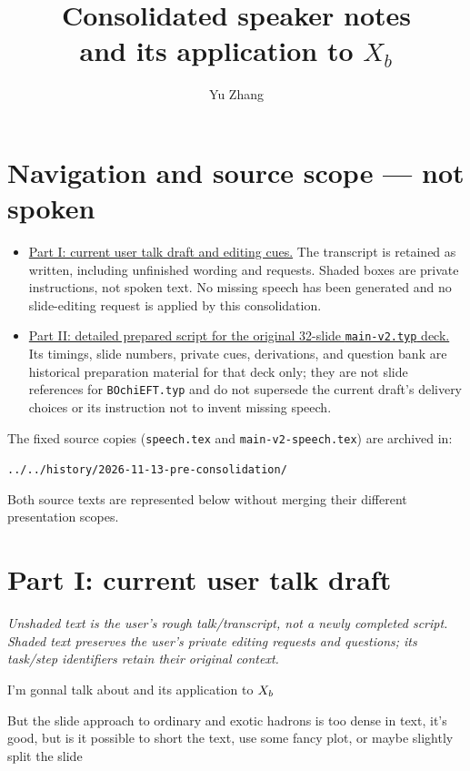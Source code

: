 \documentclass[11pt,a4paper]{article}
\title{Consolidated speaker notes\\[0.4em]
  \large \BOchiEFT{} and its application to $X_b$}
\author{Yu Zhang}
\date{}
\newcommand{\draftcue}[1]{\begin{private}#1\end{private}}
\begin{document}
\maketitle
\section*{Navigation and source scope --- not spoken}
\begin{itemize}
\item \hyperref[current-draft]{Part I: current user talk draft and editing cues.}
The transcript is retained as written, including unfinished wording and requests.
Shaded boxes are private instructions, not spoken text. No missing speech has
been generated and no slide-editing request is applied by this consolidation.
\item \hyperref[legacy-script]{Part II: detailed prepared script for the original
32-slide \texttt{main-v2.typ} deck.} Its timings, slide numbers, private cues,
derivations, and question bank are historical preparation material for that
deck only; they are not slide references for \texttt{BOchiEFT.typ} and do not
supersede the current draft's delivery choices or its instruction not to
invent missing speech.
\end{itemize}
The fixed source copies (\texttt{speech.tex} and \texttt{main-v2-speech.tex})
are archived in:\par
\noindent\texttt{../../history/2026-11-13-pre-consolidation/}\par
Both source texts are represented below without merging their different
presentation scopes.

\clearpage
{}\label{current-draft}
\section*{Part I: current user talk draft}
\textit{Unshaded text is the user's rough talk/transcript, not a newly completed
script. Shaded text preserves the user's private editing requests and questions;
its task/step identifiers retain their original context.}

I'm gonnal talk about \BOchiEFT and its application to $X_b$

\draftcue{But the slide \BOchiEFT{} approach to ordinary and exotic hadrons is too dense in text, it's good, but is it possible to short the text, use some fancy plot, or maybe slightly split the slide}
\end{document}
